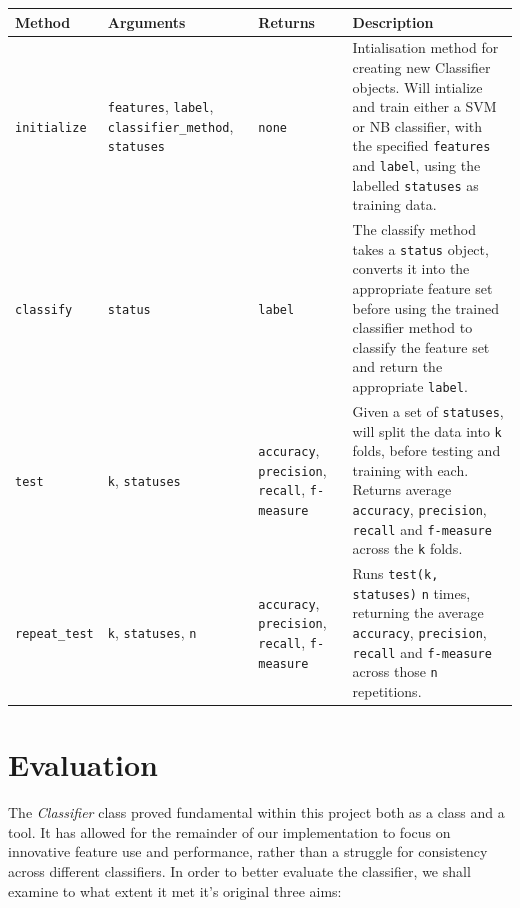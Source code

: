 \begin{centering}
	\begin{longtable}{| l | p{} | p{} | p{} |}
		\hline
		Method & Arguments & Returns & Description \\
		\hline
		\texttt{initialize} & \texttt{features}, \texttt{label}, \texttt{classifier\_method}, \texttt{statuses} & \texttt{none} & Intialisation method for creating new Classifier objects. Will intialize and train either a SVM or NB classifier, with the specified \texttt{features} and \texttt{label}, using the labelled \texttt{statuses} as training data. \\
		\hline
		\texttt{classify} & \texttt{status} & \texttt{label} & The classify method takes a \texttt{status} object, converts it into the appropriate feature set before using the trained classifier method to classify the feature set and return the appropriate \texttt{label}. \\
		\hline
		\texttt{test} & \texttt{k}, \texttt{statuses} & \texttt{accuracy}, \texttt{precision}, \texttt{recall}, \texttt{f-measure} & Given a set of \texttt{statuses}, will split the data into \texttt{k} folds, before testing and training with each. Returns average \texttt{accuracy}, \texttt{precision}, \texttt{recall} and \texttt{f-measure} across the \texttt{k} folds. \\
		\hline
		\texttt{repeat\_test} & \texttt{k}, \texttt{statuses}, \texttt{n} & \texttt{accuracy}, \texttt{precision}, \texttt{recall}, \texttt{f-measure} & Runs \texttt{test(k, statuses)} \texttt{n} times, returning the average \texttt{accuracy}, \texttt{precision}, \texttt{recall} and \texttt{f-measure} across those \texttt{n} repetitions. \\
		\hline
	\end{longtable}
\end{centering}

\section{Evaluation}

The \emph{Classifier} class proved fundamental within this project both as a class and a tool. It has allowed for the remainder of our implementation to focus on innovative feature use and performance, rather than a struggle for consistency across different classifiers. In order to better evaluate the classifier, we shall examine to what extent it met it's original three aims:

